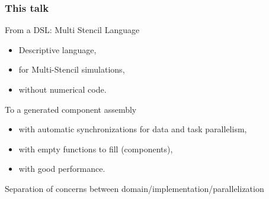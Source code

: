 \documentclass{beamer}
\begin{document}
\begin{frame}
\frametitle{This talk}
\begin{block}{From a DSL: Multi Stencil Language}
\begin{itemize}
\item Descriptive language,
\item for Multi-Stencil simulations,
\item without numerical code.
\end{itemize}
\end{block}

\begin{block}{To a generated component assembly}
\begin{itemize}
\item with automatic synchronizations for data and task parallelism,
\item with empty functions to fill (components),
\item with good performance.
\end{itemize}
\end{block}

Separation of concerns between domain/implementation/parallelization

\end{frame}

\end{document}
